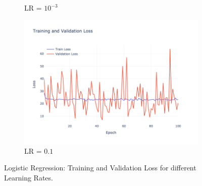 \begin{figure}[htbp!]
\begin{subfigure}{0.32\textwidth}
        \caption{LR = $10^{-3}$}
    \end{subfigure}
    \begin{subfigure}{0.32\textwidth}
        \centering
        \includegraphics[width=\textwidth]{images/logistic_regression-training-validation-loss-batch-32-lr-0.1-epochs-100-l2-0.01-opt-sgd.png}
        \caption{LR = $0.1$}
    \end{subfigure}
    \caption{Logistic Regression: Training and Validation Loss for different Learning Rates.}
    \label{fig:log_reg_loss}
\end{figure}

